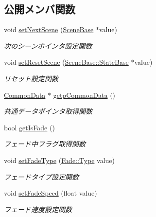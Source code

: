 \subsection*{公開メンバ関数}
\begin{DoxyCompactItemize}
\item 
void \mbox{\hyperlink{class_scene_manager_a208cc1690dcb260ae7fb94d13118f6ce}{set\+Next\+Scene}} (\mbox{\hyperlink{class_scene_base}{Scene\+Base}} $\ast$value)
\begin{DoxyCompactList}\small\item\em 次のシーンポインタ設定関数 \end{DoxyCompactList}\item 
void \mbox{\hyperlink{class_scene_manager_a3c3eb28c97fb0f5091aa26917dc2ecaf}{set\+Reset\+Scene}} (\mbox{\hyperlink{class_scene_base_1_1_state_base}{Scene\+Base\+::\+State\+Base}} $\ast$value)
\begin{DoxyCompactList}\small\item\em リセット設定関数 \end{DoxyCompactList}\item 
\mbox{\hyperlink{class_scene_manager_1_1_common_data}{Common\+Data}} $\ast$ \mbox{\hyperlink{class_scene_manager_a4de42577d81672dee3e79300e745553c}{getp\+Common\+Data}} ()
\begin{DoxyCompactList}\small\item\em 共通データポインタ取得関数 \end{DoxyCompactList}\item 
bool \mbox{\hyperlink{class_scene_manager_a92336770a77daef88d99f14352a53c60}{get\+Is\+Fade}} ()
\begin{DoxyCompactList}\small\item\em フェード中フラグ取得関数 \end{DoxyCompactList}\item 
void \mbox{\hyperlink{class_scene_manager_a95bb32ee4d3461bf56381d288a98c61b}{set\+Fade\+Type}} (\mbox{\hyperlink{class_fade_ac06f27215b454aa05b93c236476d6e80}{Fade\+::\+Type}} value)
\begin{DoxyCompactList}\small\item\em フェードタイプ設定関数 \end{DoxyCompactList}\item 
void \mbox{\hyperlink{class_scene_manager_af3b87ef963b80aa1942a2f804f61bdeb}{set\+Fade\+Speed}} (float value)
\begin{DoxyCompactList}\small\item\em フェード速度設定関数 \end{DoxyCompactList}\item 

\end{DoxyCompactItemize}
